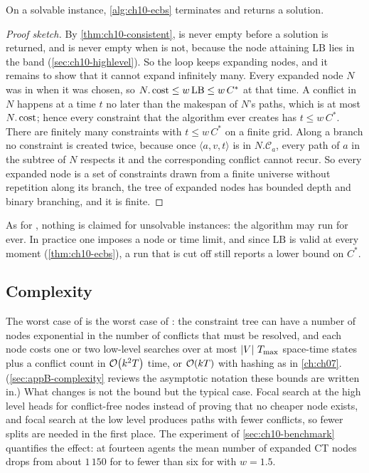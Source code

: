 \begin{proposition}
\label{thm:ch10-terminates}
On a solvable instance, \cref{alg:ch10-ecbs} terminates and returns a
solution.
\end{proposition}
\begin{proof}[Proof sketch]
By \cref{thm:ch10-consistent}, \Open is never empty before a solution is
returned, and \Focal is never empty when \Open is not, because the node
attaining $\mathrm{LB}$ lies in the band (\cref{sec:ch10-highlevel}). So the
loop keeps expanding nodes, and it remains to show that it cannot expand
infinitely many. Every expanded node $N$ was in \Focal when it was chosen,
so $N.\operatorname{cost} \le w\,\mathrm{LB} \le w\,C^*$ at that time. A conflict in $N$
happens at a time $t$ no later than the makespan of $N$'s paths, which is at
most $N.\operatorname{cost}$; hence every constraint that the algorithm ever creates has
$t \le w\,C^*$. There are finitely many constraints with $t \le w\,C^*$ on a
finite grid. Along a branch no constraint is created twice, because once
$\langle a, v, t\rangle$ is in $N.\mathcal{C}_a$, every path of $a$ in the
subtree of $N$ respects it and the corresponding conflict cannot recur. So
every expanded node is a set of constraints drawn from a finite universe
without repetition along its branch, the tree of expanded nodes has bounded
depth and binary branching, and it is finite.
\end{proof}

As for \cbs, nothing is claimed for unsolvable instances: the algorithm may
run for ever. In practice one imposes a node or time limit, and since
$\mathrm{LB}$ is valid at every moment (\cref{thm:ch10-ecbs}), a run that is
cut off still reports a lower bound on $C^*$.

\subsection{Complexity}

The worst case of \ecbs is the worst case of \cbs: the constraint tree can
have a number of nodes exponential in the number of conflicts that must be
resolved, and each node costs one or two low-level searches over at most
$\left\lvert V \right\rvert\,T_{\max}$ space-time states plus a conflict count in
$\mathcal{O}\!\left(k^2 T\right)$ time, or $\mathcal{O}\!\left(k T\right)$ with hashing as in \cref{ch:ch07}.
(\cref{sec:appB-complexity} reviews the asymptotic notation these bounds are
written in.)
What changes is not the bound but the typical case. Focal search at the high
level heads for conflict-free nodes instead of proving that no cheaper node
exists, and focal search at the low level produces paths with fewer
conflicts, so fewer splits are needed in the first place. The experiment of
\cref{sec:ch10-benchmark} quantifies the effect: at fourteen agents the mean
number of expanded CT nodes drops from about $1\,150$ for \cbs to fewer than
six for \ecbs with $w = 1.5$.

